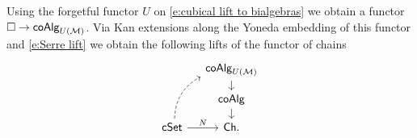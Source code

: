 Using the forgetful functor $U$ on \eqref{e:cubical lift to bialgebras} we obtain a functor $\square \to \mathsf{coAlg}_{U(\mathcal{M})}$.
Via Kan extensions along the Yoneda embedding of this functor and \eqref{e:Serre lift} we obtain the following lifts of the functor of chains
\begin{equation}
\begin{tikzcd}[column sep=small, row sep=small]
& \coAlg_{U(\M)} \arrow[d] \\
& \coAlg \arrow[d] \\
\cSet \arrow[r, "N"] \arrow[dashed, uur, bend left]& \Ch.
\end{tikzcd}
\end{equation}

